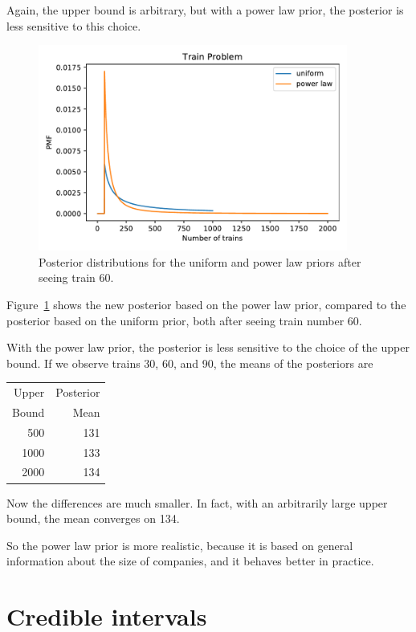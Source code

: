 \documentclass[12pt]{book}
\theoremstyle{exercise}
\begin{document}
Again, the upper bound is arbitrary, but with a power law prior, the posterior is less sensitive to this choice.

\begin{figure}
\centerline{\includegraphics[width=4in]{figs/fig04-02.pdf}}
\caption{Posterior distributions for the uniform and power law priors
after seeing train 60.}
\label{fig04-02}
\end{figure}

Figure~\ref{fig04-02} shows the new posterior based on the power law prior, compared to the posterior based on the uniform prior, both after seeing train number 60.

With the power law prior, the posterior is less sensitive to the choice of the upper bound.
If we observe trains 30, 60, and 90, the means of the posteriors are

\begin{tabular}{rr}
\toprule
Upper & Posterior \\
Bound & Mean \\
\midrule
  500 & 131 \\
  1000 & 133 \\
  2000 & 134 \\
\bottomrule
\end{tabular}

Now the differences are much smaller.  In fact,
with an arbitrarily large upper bound, the mean converges on 134.

So the power law prior is more realistic, because it is based on
general information about the size of companies, and it behaves better in practice.


\section{Credible intervals}
\label{credible}
\end{document}
